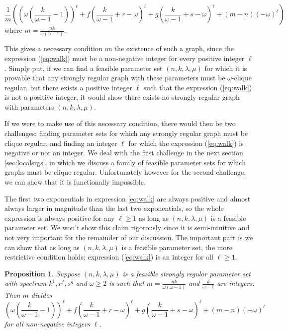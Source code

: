 \documentclass[12pt]{report}
\newtheorem{prop}[thm]{Proposition}
\theoremstyle{definition}
\begin{document}
\begin{equation} \label{eq:walk}
\frac{1}{m}\left(\left(\omega\left(\frac{k}{\omega-1}-1\right)\right)^\ell+f\left(\frac{k}{\omega -1} +r - \omega\right)^\ell+g\left(\frac{k}{\omega -1} +s - \omega\right)^\ell+(m-n)(-\omega)^\ell\right)\end{equation}
where $m=\frac{nk}{\omega(\omega-1)}$.\par
This gives a necessary condition on the existence of such a graph, since the expression (\ref{eq:walk}) must be a non-negative integer for every positive integer $\ell$. Simply put, if we can find a feasible parameter set $(n,k,\lambda,\mu)$ for which it is provable that any strongly regular graph with these parameters must be $\omega$-clique regular, but there exists a positive integer $\ell$ such that the expression (\ref{eq:walk}) is not a positive integer, it would show there exists no strongly regular graph with parameters $(n,k,\lambda,\mu)$.\par
If we were to make use of this necessary condition, there would then be two challenges: finding parameter sets for which any strongly regular graph must be clique regular, and finding an integer $\ell$ for which the expression (\ref{eq:walk}) is negative or not an integer. We deal with the first challenge in the next section \ref{sec:localsrgs}, in which we discuss a family of feasible parameter sets for which graphs must be clique regular. Unfortunately however for the second challenge, we can show that it is functionally impossible.\par
 The first two exponentials in expression \ref{eq:walk} are always positive and almost always larger in magnitude than the last two exponentials, so the whole expression is always positive for any $\ell\geq 1$ as long as $(n,k,\lambda,\mu)$ is a feasible parameter set. We won't show this claim rigorously since it is semi-intuitive and not very important for the remainder of our discussion. The important part is we can show that as long as $(n,k,\lambda,\mu)$ is a feasible parameter set, the more restrictive condition holds; expression (\ref{eq:walk}) is an integer for all $\ell \geq 1$.
\begin{prop}
    Suppose $(n,k,\lambda, \mu)$ is a feasible strongly regular parameter set with spectrum $k^1,r^f, s^g$ and $\omega \geq 2$ is such that $m=\frac{nk}{\omega(\omega -1)}$ and $\frac{k}{\omega -1}$ are integers. Then $m$ divides 
    \[\left(\omega\left(\frac{k}{\omega-1}-1\right)\right)^\ell+f\left(\frac{k}{\omega -1} +r - \omega\right)^\ell+g\left(\frac{k}{\omega -1} +s - \omega\right)^\ell+(m-n)(-\omega)^\ell\]
    for all non-negative integers $\ell$.
\end{prop}
\end{document}
